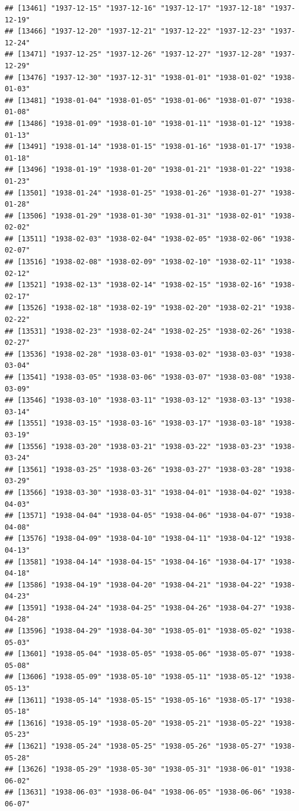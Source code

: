 \documentclass{article}\usepackage[]{graphicx}\usepackage[]{color}
\makeatletter
\newenvironment{kframe}{%
 \def\at@end@of@kframe{}%
 \ifinner\ifhmode%
  \def\at@end@of@kframe{\end{minipage}}%
  \begin{minipage}{\columnwidth}%
 \fi\fi%
 \def\FrameCommand##1{\hskip\@totalleftmargin \hskip-\fboxsep
 \colorbox{shadecolor}{##1}\hskip-\fboxsep
     \hskip-\linewidth \hskip-\@totalleftmargin \hskip\columnwidth}%
 \MakeFramed {\advance\hsize-\width
   \@totalleftmargin\z@ \linewidth\hsize
   \@setminipage}}%
 {\par\unskip\endMakeFramed%
 \at@end@of@kframe}
\newenvironment{knitrout}{}{} %
\makeatother
\begin{document}
\begin{description}
\begin{knitrout}
\begin{kframe}
\begin{verbatim}
## [13461] "1937-12-15" "1937-12-16" "1937-12-17" "1937-12-18" "1937-12-19"
## [13466] "1937-12-20" "1937-12-21" "1937-12-22" "1937-12-23" "1937-12-24"
## [13471] "1937-12-25" "1937-12-26" "1937-12-27" "1937-12-28" "1937-12-29"
## [13476] "1937-12-30" "1937-12-31" "1938-01-01" "1938-01-02" "1938-01-03"
## [13481] "1938-01-04" "1938-01-05" "1938-01-06" "1938-01-07" "1938-01-08"
## [13486] "1938-01-09" "1938-01-10" "1938-01-11" "1938-01-12" "1938-01-13"
## [13491] "1938-01-14" "1938-01-15" "1938-01-16" "1938-01-17" "1938-01-18"
## [13496] "1938-01-19" "1938-01-20" "1938-01-21" "1938-01-22" "1938-01-23"
## [13501] "1938-01-24" "1938-01-25" "1938-01-26" "1938-01-27" "1938-01-28"
## [13506] "1938-01-29" "1938-01-30" "1938-01-31" "1938-02-01" "1938-02-02"
## [13511] "1938-02-03" "1938-02-04" "1938-02-05" "1938-02-06" "1938-02-07"
## [13516] "1938-02-08" "1938-02-09" "1938-02-10" "1938-02-11" "1938-02-12"
## [13521] "1938-02-13" "1938-02-14" "1938-02-15" "1938-02-16" "1938-02-17"
## [13526] "1938-02-18" "1938-02-19" "1938-02-20" "1938-02-21" "1938-02-22"
## [13531] "1938-02-23" "1938-02-24" "1938-02-25" "1938-02-26" "1938-02-27"
## [13536] "1938-02-28" "1938-03-01" "1938-03-02" "1938-03-03" "1938-03-04"
## [13541] "1938-03-05" "1938-03-06" "1938-03-07" "1938-03-08" "1938-03-09"
## [13546] "1938-03-10" "1938-03-11" "1938-03-12" "1938-03-13" "1938-03-14"
## [13551] "1938-03-15" "1938-03-16" "1938-03-17" "1938-03-18" "1938-03-19"
## [13556] "1938-03-20" "1938-03-21" "1938-03-22" "1938-03-23" "1938-03-24"
## [13561] "1938-03-25" "1938-03-26" "1938-03-27" "1938-03-28" "1938-03-29"
## [13566] "1938-03-30" "1938-03-31" "1938-04-01" "1938-04-02" "1938-04-03"
## [13571] "1938-04-04" "1938-04-05" "1938-04-06" "1938-04-07" "1938-04-08"
## [13576] "1938-04-09" "1938-04-10" "1938-04-11" "1938-04-12" "1938-04-13"
## [13581] "1938-04-14" "1938-04-15" "1938-04-16" "1938-04-17" "1938-04-18"
## [13586] "1938-04-19" "1938-04-20" "1938-04-21" "1938-04-22" "1938-04-23"
## [13591] "1938-04-24" "1938-04-25" "1938-04-26" "1938-04-27" "1938-04-28"
## [13596] "1938-04-29" "1938-04-30" "1938-05-01" "1938-05-02" "1938-05-03"
## [13601] "1938-05-04" "1938-05-05" "1938-05-06" "1938-05-07" "1938-05-08"
## [13606] "1938-05-09" "1938-05-10" "1938-05-11" "1938-05-12" "1938-05-13"
## [13611] "1938-05-14" "1938-05-15" "1938-05-16" "1938-05-17" "1938-05-18"
## [13616] "1938-05-19" "1938-05-20" "1938-05-21" "1938-05-22" "1938-05-23"
## [13621] "1938-05-24" "1938-05-25" "1938-05-26" "1938-05-27" "1938-05-28"
## [13626] "1938-05-29" "1938-05-30" "1938-05-31" "1938-06-01" "1938-06-02"
## [13631] "1938-06-03" "1938-06-04" "1938-06-05" "1938-06-06" "1938-06-07"

\end{verbatim}
\end{kframe}
\end{knitrout}
\end{description}
\end{document}
